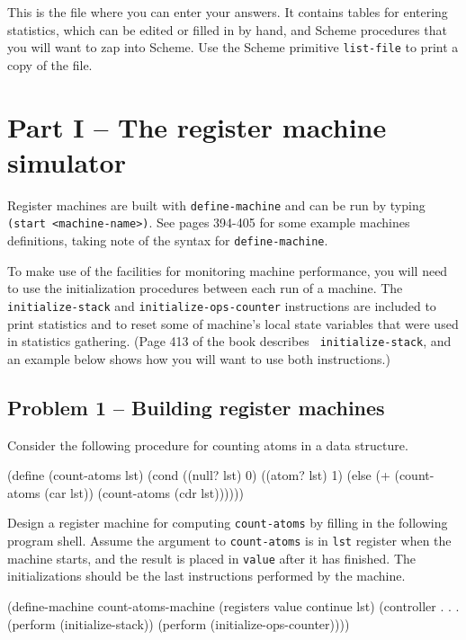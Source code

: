 This is the file where you can enter your answers.  It contains tables
for entering statistics, which can be edited or filled in by hand,
and Scheme procedures that you will want to zap into Scheme. Use the 
Scheme primitive {\tt list-file} to print a copy of the file.

\chapter{Part I -- The register machine simulator}

Register machines are built with {\tt define-machine} and can be run by 
typing {\tt (start <machine-name>)}.  See pages 394-405 for some example 
machines definitions, taking note of the syntax for {\tt define-machine}.

To make use of the facilities for monitoring machine performance, you will need
to use the initialization procedures between each run of a machine.  The {\tt
initialize-stack} and {\tt initialize-ops-counter} instructions are included to
print statistics and to reset some of machine's local state variables that were
used in statistics gathering.  (Page 413 of the book describes {\tt
initialize-stack}, and an example below shows how you will want to use
both instructions.)

\section{Problem 1 -- Building register machines}

Consider the following procedure for counting atoms in a data structure.

\beginlisp
(define (count-atoms lst)
        (cond ((null? lst) 0)
              ((atom? lst) 1)
              (else (+ (count-atoms (car lst))
                       (count-atoms (cdr lst))))))
\endlisp

Design a register machine for computing {\tt count-atoms} by filling
in the following program shell.  Assume the argument to {\tt count-atoms} is 
in {\tt lst} register when the machine starts, and the result is placed in
{\tt value} after it has finished.  The initializations should be the
last instructions performed by the machine.

\beginlisp
(define-machine count-atoms-machine
  (registers value continue lst)
  (controller
        .
        .
        .
    (perform (initialize-stack))
    (perform (initialize-ops-counter))))
\endlisp

